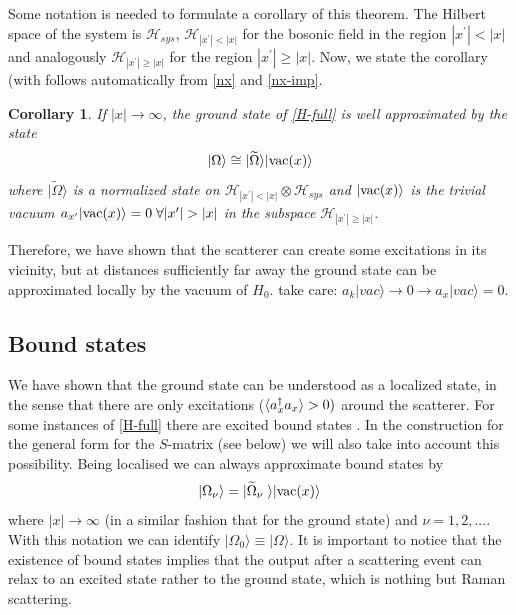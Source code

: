 \documentclass[notitlepage, prx, preprint, amsmath,superscriptaddress,amssymb]{revtex4-1}
\newtheorem{corollary}{Corollary}[section]
\begin{document}
Some notation is needed to formulate a corollary of this theorem.  The Hilbert space of the system is $\mathcal H_{sys}$,  $\mathcal H_{|x^\prime | < |x|} $ for the bosonic field in the region $ |x^\prime | < |x|$ and analogously $\mathcal H_{|x^\prime| \geq  |x| }$ for the region $  |x^\prime | \geq |x|$. 
Now, we state the corollary (with follows automatically from \eqref{nx} and \eqref{nx-imp}.

\begin{corollary}
\label{coro:gs}
If  $|x| \to \infty$, 
the ground state of \eqref{H-full} is  well approximated by the state
\begin{equation}
\label{gs-ansatz}
|\Omega \rangle \cong | \widetilde \Omega \rangle | {\rm vac} (x) \rangle 
\end{equation}
where $\vert \widetilde \Omega \rangle$  is a normalized  state   on $\mathcal H_{|x^\prime| < |x|}  \otimes \mathcal H_{sys}$ and $|{\rm vac} (x) \rangle$ is  the trivial vacuum $a_{x^\prime} | {\rm vac} (x) \rangle=0 \; \forall |x^\prime| > |x|$ in the subspace $\mathcal H_{|x^\prime| \geq |x| }$.
\end{corollary}

Therefore, we have shown that the scatterer can create some excitations in its vicinity, but at distances sufficiently far away the ground state can be approximated locally by the vacuum of $H_0$.
{\color{red} take care: $a_k |vac\rangle \to 0 \to a_x  | vac \rangle =0$}.





\subsection{Bound states}

We have shown that the ground state can be understood as a localized state, in the sense that there are only excitations ($\braket{a_x^\dagger a_x} > 0)$  around the scatterer.   For some instances of \eqref{H-full}  there are excited bound states \cite{}.  In the construction for the general form for the $S$-matrix (see below) we will also take into account   this possibility.  Being localised we can always approximate bound states by 
\begin{equation}
\label{bound}
| \Omega_\nu \rangle = | \widetilde \Omega_\nu  \; \rangle | {\rm vac}(x) \rangle
\end{equation}
where $|x|\to \infty$ (in a similar fashion that for the ground state) and 
 $\nu = 1, 2, ...$. With this notation we can identify $| \Omega_0 \rangle \equiv | \Omega \rangle$.
It is important to notice that the existence of bound states implies that the output after a scattering event can relax to an excited state rather to the ground state, which is nothing but Raman scattering.
\end{document}
